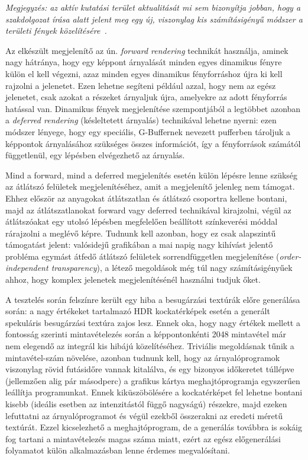 \textit{Megjegyzés: az aktív kutatási terület aktualitását mi sem bizonyítja jobban, hogy a szakdolgozat írása alatt jelent meg egy új, viszonylag kis számításigényű módszer a területi fények közelítésére~\cite{real_time_area_light}. }

Az elkészült megjelenítő az ún. \textit{forward rendering} technikát használja, aminek nagy hátránya, hogy egy képpont árnyalását minden egyes dinamikus fényre külön el kell végezni, azaz minden egyes dinamikus fényforráshoz újra ki kell rajzolni a jelenetet. Ezen lehetne segíteni például azzal, hogy nem az egész jelenetet, csak azokat a részeket árnyaljuk újra, amelyekre az adott fényforrás hatással van. Dinamikus fények megjelenítése szempontjából a legtöbbet azonban a \textit{deferred rendering} (késleltetett árnyalás) technikával lehetne nyerni: ezen módszer lényege, hogy egy speciális, G-Buffernek nevezett pufferben tároljuk a képpontok árnyalásához szükséges összes információt, így a fényforrások számától függetlenül, egy lépésben elvégezhető az árnyalás.

Mind a forward, mind a deferred megjelenítés esetén külön lépésre lenne szükség az átlátszó felületek megjelenítéséhez, amit a megjelenítő jelenleg nem támogat. Ehhez először az anyagokat átlátszatlan és átlátszó csoportra kellene bontani, majd az átlátszatlanokat forward vagy deferred technikával kirajzolni, végül az átlátszóakat egy utolsó lépésben megfelelően beállított színkeverési móddal rárajzolni a meglévő képre. Tudnunk kell azonban, hogy ez csak alapszintű támogatást jelent: valósidejű grafikában a mai napig nagy kihívást jelentő probléma egymást átfedő átlátszó felületek sorrendfüggetlen megjelenítése (\textit{order-independent transparency}), a létező megoldások még túl nagy számításigényűek ahhoz, hogy komplex jelenetek megjelenítésénél használni tudjuk őket.

A tesztelés során felszínre került egy hiba a besugárzási textúrák előre generálása során: a nagy értékeket tartalmazó HDR kockatérképek esetén a generált spekuláris besugárzási textúra zajos lesz. Ennek oka, hogy nagy értékek mellett a fontosság szerinti mintavételezés során a képpontonkénti 2048 mintavétel már nem elegendő az integrál kis hibájú közelítéséhez. Triviális megoldásnak tűnik a mintavétel-szám növelése, azonban tudnunk kell, hogy az árnyalóprogramok viszonylag rövid futásidőre vannak kitalálva, és egy bizonyos időkeretet túllépve (jellemzően alig pár másodperc) a grafikus kártya meghajtóprogramja egyszerűen leállítja programunkat. Ennek kiküszöbölésére a kockatérképet fel lehetne bontani kisebb (ideális esetben az intenzitástól függő nagyságú) részekre, majd ezeken lefuttatni az árnyalóprogramot és végül ezekből összerakni az eredeti méretű textúrát. Ezzel kicselezhető a meghajtóprogram, de a generálás továbbra is sokáig fog tartani a mintavételezés magas száma miatt, ezért az egész előgenerálási folyamatot külön alkalmazásban lenne érdemes megvalósítani.


